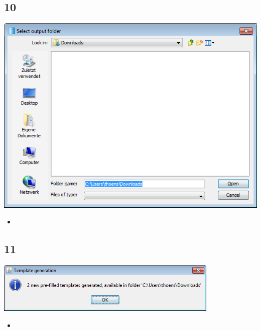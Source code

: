 \documentclass{beamer}
\begin{document}
\subsection{10}
\begin{frame}
	\begin{center}
  		\includegraphics[height=0.5\textheight]{10.png}
	\end{center}
	\begin{itemize}
		\item
	\end{itemize}
\end{frame}

\subsection{11}
\begin{frame}
	\begin{center}
  		\includegraphics[width=0.8\textwidth]{11.png}
	\end{center}
	\begin{itemize}
		\item
	\end{itemize}
\end{frame}
\end{document}
